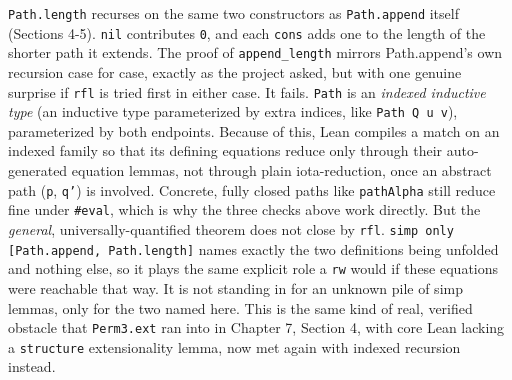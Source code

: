 \texttt{Path.length} recurses on the same two constructors as \texttt{Path.append} itself (Sections 4-5). \texttt{nil} contributes \texttt{0}, and each \texttt{cons} adds one to the length of the shorter path it extends. The proof of \texttt{append\_\allowbreak{}length} mirrors Path.append's own recursion case for case, exactly as the project asked, but with one genuine surprise if \texttt{rfl} is tried first in either case. It fails. \texttt{Path} is an \emph{indexed inductive type} (an inductive type parameterized by extra indices, like \texttt{Path Q u v}), parameterized by both endpoints. Because of this, Lean compiles a match on an indexed family so that its defining equations reduce only through their auto-generated equation lemmas, not through plain iota-reduction, once an abstract path (\texttt{p}, \texttt{q'}) is involved. Concrete, fully closed paths like \texttt{pathAlpha} still reduce fine under \texttt{\#eval}, which is why the three checks above work directly. But the \emph{general}, universally-quantified theorem does not close by \texttt{rfl}. \texttt{simp only [Path.append, Path.length]} names exactly the two definitions being unfolded and nothing else, so it plays the same explicit role a \texttt{rw} would if these equations were reachable that way. It is not standing in for an unknown pile of simp lemmas, only for the two named here. This is the same kind of real, verified obstacle that \texttt{Perm3.ext} ran into in Chapter 7, Section 4, with core Lean lacking a \texttt{structure} extensionality lemma, now met again with indexed recursion instead.

